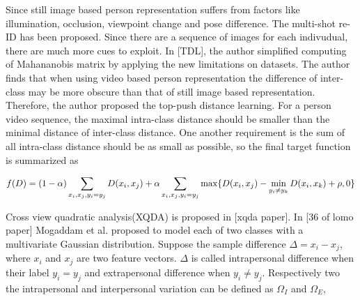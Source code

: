 Since still image based person representation suffers from factors like illumination, occlusion, viewpoint change and pose difference. The multi-shot re-ID has been proposed. Since there are a sequence of images for each indivudual, there are much more cues to exploit.
In [TDL], the author simplified computing of Mahananobis matrix by applying the new limitations on datasets. The author finds that when using video based person representation the difference of inter-class may be more obscure than that of still image based representation. Therefore, the author proposed the top-push distance learning. For a person video sequence, the maximal intra-class distance should be smaller than the minimal distance of inter-class distance. One another requirement is the sum of all intra-class distance should be as small as possible, so the final target function is summarized as 

\begin{equation}
f(D) = (1-\alpha)\sum_{x_i,x_j,y_i=y_j} D(x_i,x_j) + \\ \alpha \sum_{x_i,x_j,y_i=y_j}\max\{{D(x_i,x_j)-\min_{y_i\ne y_k}{D(x_i,x_k)}+\rho,0}\}
\end{equation}

Cross view quadratic analysis(XQDA) is proposed in [xqda paper]. In [36 of lomo paper] Mogaddam et al. proposed to model each of two classes with a multivariate Gaussian  distribution. Suppose the sample difference $\Delta = x_i - x_j$, where $x_i$ and $x_j$ are two feature vectors. $\Delta$ is called intrapersonal difference when their label $y_i = y_j$ and extrapersonal difference when $y_i \ne y_j$. Respectively two the intrapersonal and interpersonal variation can be defined as $\Omega_I$ and $\Omega_E$,


